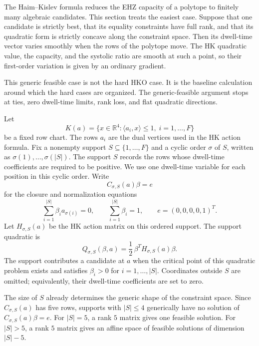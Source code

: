 \begin{unverified}
The Haim--Kislev formula reduces the EHZ capacity of a polytope to finitely
many algebraic candidates. This section treats the easiest case. Suppose that
one candidate is strictly best, that its equality constraints have full rank,
and that its quadratic form is strictly concave along the constraint space.
Then its dwell-time vector varies smoothly when the rows of the polytope move.
The HK quadratic value, the capacity, and the systolic ratio are smooth at such
a point, so their first-order variation is given by an ordinary gradient.

This generic feasible case is not the hard HKO case. It is the baseline
calculation around which the hard cases are organized. The generic-feasible
argument stops at ties, zero dwell-time limits, rank loss, and flat quadratic
directions.

Let
\[
  K(a) = \{x \in \mathbb{R}^4 : \langle a_i,x\rangle \leq 1,\;
    i=1,\ldots,F\}
\]
be a fixed row chart. The rows \(a_i\) are the dual vertices used in the HK
action formula. Fix a nonempty support \(S\subseteq \{1,\ldots,F\}\) and a
cyclic order \(\sigma\) of \(S\), written as
\(\sigma(1),\ldots,\sigma(|S|)\). The support \(S\) records the rows whose
dwell-time coefficients are required to be positive. We use one dwell-time
variable for each position in this cyclic order. Write
\[
  C_{\sigma,S}(a)\beta = e
\]
for the closure and normalization equations
\[
  \sum_{i=1}^{|S|}\beta_i a_{\sigma(i)} = 0,
  \qquad
  \sum_{i=1}^{|S|}\beta_i = 1,
  \qquad
  e=(0,0,0,0,1)^T .
\]
Let \(H_{\sigma,S}(a)\) be the HK action matrix on this ordered support. The
support quadratic is
\[
  Q_{\sigma,S}(\beta,a)
    = \frac12\,\beta^T H_{\sigma,S}(a)\beta .
\]
The support contributes a candidate at \(a\) when the critical point of this
quadratic problem exists and satisfies \(\beta_i>0\) for
\(i=1,\ldots,|S|\).
Coordinates outside \(S\) are omitted; equivalently, their dwell-time
coefficients are set to zero.

The size of \(S\) already determines the generic shape of the constraint
space. Since \(C_{\sigma,S}(a)\) has five rows, supports with
\(|S|\leq 4\) generically have no solution of
\(C_{\sigma,S}(a)\beta=e\). For \(|S|=5\), a rank \(5\) matrix gives one
feasible solution. For \(|S|>5\), a rank \(5\) matrix gives an affine space of
feasible solutions of dimension \(|S|-5\).


\end{unverified}
